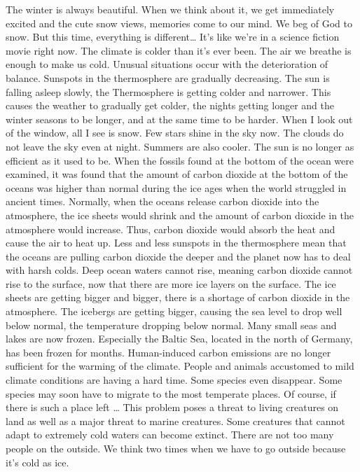 \documentclass[]{book}
\begin{document}
The winter is always beautiful. When we think about it, we get immediately excited and the cute snow views, memories come to our mind. We beg of God to snow. But this time, everything is different\ldots{} It's like we're in a science fiction movie right now. The climate is colder than it's ever been. The air we breathe is enough to make us cold. Unusual situations occur with the deterioration of balance. Sunspots in the thermosphere are gradually decreasing. The sun is falling asleep slowly, the Thermosphere is getting colder and narrower. This causes the weather to gradually get colder, the nights getting longer and the winter seasons to be longer, and at the same time to be harder. When I look out of the window, all I see is snow. Few stars shine in the sky now. The clouds do not leave the sky even at night. Summers are also cooler. The sun is no longer as efficient as it used to be. When the fossils found at the bottom of the ocean were examined, it was found that the amount of carbon dioxide at the bottom of the oceans was higher than normal during the ice ages when the world struggled in ancient times. Normally, when the oceans release carbon dioxide into the atmosphere, the ice sheets would shrink and the amount of carbon dioxide in the atmosphere would increase. Thus, carbon dioxide would absorb the heat and cause the air to heat up. Less and less sunspots in the thermosphere mean that the oceans are pulling carbon dioxide the deeper and the planet now has to deal with harsh colds. Deep ocean waters cannot rise, meaning carbon dioxide cannot rise to the surface, now that there are more ice layers on the surface. The ice sheets are getting bigger and bigger, there is a shortage of carbon dioxide in the atmosphere. The icebergs are getting bigger, causing the sea level to drop well below normal, the temperature dropping below normal. Many small seas and lakes are now frozen. Especially the Baltic Sea, located in the north of Germany, has been frozen for months. Human-induced carbon emissions are no longer sufficient for the warming of the climate. People and animals accustomed to mild climate conditions are having a hard time. Some species even disappear. Some species may soon have to migrate to the most temperate places. Of course, if there is such a place left \ldots{} This problem poses a threat to living creatures on land as well as a major threat to marine creatures. Some creatures that cannot adapt to extremely cold waters can become extinct. There are not too many people on the outside. We think two times when we have to go outside because it's cold as ice.
\end{document}

